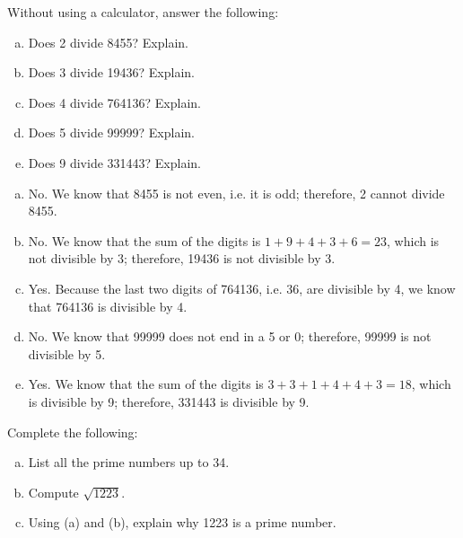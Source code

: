 \documentclass[11pt,letterpaper]{article}
\begin{document}
\newpage



 Without using a calculator, answer the following:
	\begin{enumerate}[(a)]
	\item Does 2 divide 8455? Explain.
	\item Does 3 divide 19436? Explain.
	\item Does 4 divide 764136? Explain.
	\item Does 5 divide 99999? Explain.
	\item Does 9 divide 331443? Explain. 
	\end{enumerate} \pspace

\sol 
\begin{enumerate}[(a)]
\item No. We know that 8455 is not even, i.e. it is odd; therefore, 2 cannot divide 8455. \pspace

\item No. We know that the sum of the digits is $1 + 9 + 4 + 3 + 6= 23$, which is not divisible by 3; therefore, 19436 is not divisible by 3. \pspace

\item Yes. Because the last two digits of 764136, i.e. 36, are divisible by 4, we know that 764136 is divisible by 4. \pspace

\item No. We know that 99999 does not end in a 5 or 0; therefore, 99999 is not divisible by 5. \pspace

\item Yes. We know that the sum of the digits is $3 + 3 + 1 + 4 + 4 + 3= 18$, which is divisible by 9; therefore, 331443 is divisible by 9. 
\end{enumerate}



\newpage



 Complete the following:
	\begin{enumerate}[(a)]
	\item List all the prime numbers up to 34.
	\item Compute $\sqrt{1223}$.
	\item Using (a) and (b), explain why 1223 is a prime number. 
	\end{enumerate} \pspace
\end{document}
